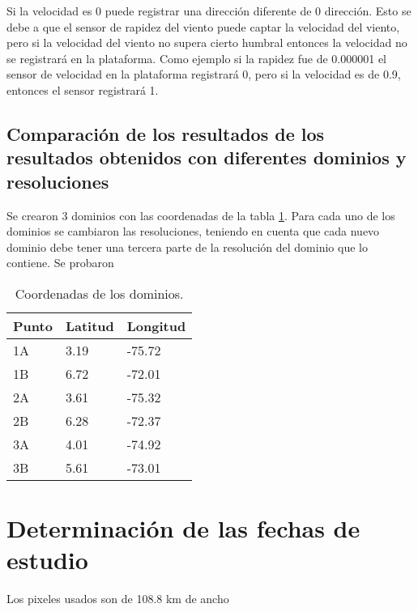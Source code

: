 Si la velocidad es 0 puede registrar una dirección diferente de 0 dirección. Esto se debe a que el sensor de rapidez del viento puede captar la velocidad del viento, pero si la velocidad del viento no supera cierto humbral entonces la velocidad no se registrará en la plataforma. Como ejemplo si la rapidez fue de 0.000001 el sensor de velocidad en la plataforma registrará 0, pero si la velocidad es de 0.9, entonces el sensor registrará 1.

\subsection{Comparación de los resultados de los resultados obtenidos con diferentes dominios y resoluciones}

Se crearon 3 dominios con las coordenadas de la tabla \ref{tabla_coordenadas_dominios}. Para cada uno de los dominios se cambiaron las resoluciones, teniendo en cuenta que cada nuevo dominio debe tener una tercera parte de la resolución del dominio que lo contiene. Se probaron 

\begin{center}

\begin{table}[H]
\begin{tabular}{lll}
Punto & Latitud & Longitud \\ \hline
1A    & 3.19    & -75.72   \\
1B    & 6.72    & -72.01   \\
2A    & 3.61    & -75.32   \\
2B    & 6.28    & -72.37   \\
3A    & 4.01    & -74.92   \\
3B    & 5.61    & -73.01  
\end{tabular}
\caption{Coordenadas de los dominios.}
\label{tabla_coordenadas_dominios}
\end{table}
\end{center}


\section{Determinación de las fechas de estudio}%

Los pixeles usados son de 108.8 km de ancho

